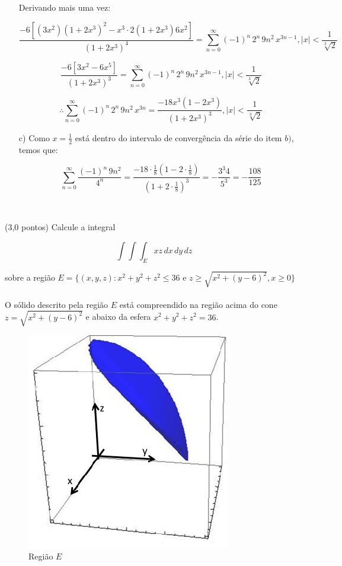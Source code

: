 \documentclass[12pt,a4paper]{article}
\begin{document}
\begin{itemize}
     Derivando mais uma vez:
     
     $$ \frac{-6 [ (3 x^2) (1 + 2x^3)^2 - x^3 \cdot 2 (1 + 2 x^3) 6 x^2 ] }{(1 + 2x^3)^4} =  \sum_{n=0}^\infty (-1)^n  \, 2^n \, 9 n^2 \, x^{3n-1}, |x| < \frac{1}{\sqrt[3]{2}} $$
     
     $$ \frac{-6 [ 3 x^2 - 6 x^5 ] }{(1 + 2x^3)^3} =  \sum_{n=0}^\infty (-1)^n  \, 2^n \, 9 n^2 \, x^{3n-1}, |x| < \frac{1}{\sqrt[3]{2}} $$
     
     $$ \therefore \sum_{n=0}^\infty (-1)^n  \, 2^n \, 9 n^2 \, x^{3n} = \frac{-18 x^3 (1 - 2 x^3)}{(1 + 2 x^3)^3} , |x| < \frac{1}{\sqrt[3]{2}} $$
     
     \item[c)] Como $ x = \frac{1}{2}$ está dentro do intervalo de convergência da série do item $b)$, temos que:
     
     $$  \sum_{n=0}^\infty   \frac{(-1)^n  \, 9 n^2}{4^n} = \frac{-18 \cdot \frac{1}{8} (1 - 2 \cdot \frac{1}{8})}{(1 + 2  \cdot \frac{1}{8})^3} = -\frac{3^3 4}{5^3} = -\frac{108}{125} $$
    

\end{itemize}
\ \

\newpage

(3,0 pontos) Calcule a integral

$$ \int \int \int_E xz \,dx \,dy \,dz $$

sobre a região $ E = \{ (x,y,z): x^2 + y^2 + z^2 \leq 36 $ e $ z \geq \sqrt{ x^2 + (y-6)^2 }, x \geq 0 \} $ \\

 \\

O sólido descrito pela região $E$ está compreendido na região acima do cone $z = \sqrt{ x^2 + (y-6)^2 } $ e abaixo da esfera $ x^2 + y^2 + z^2 = 36 $.

\begin{figure}[h!]
	\centering
	\includegraphics[scale=0.5]{Q2A.jpg}  
	\caption{Região $E$}
	\label{fig:figura4}
\end{figure}
\end{document}
